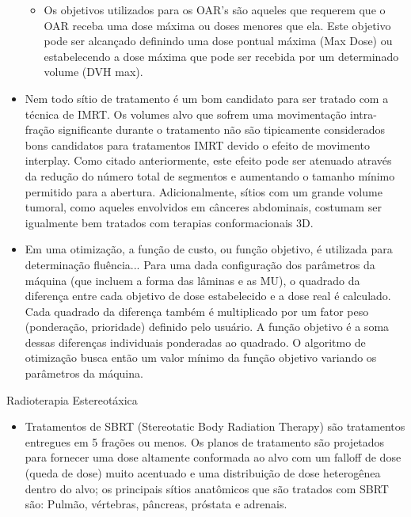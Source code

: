 \documentclass[11pt,a4paper]{article}
\newcounter{exemplo}
\begin{document}
\begin{exemplo}
\begin{itemize}
\begin{itemize}[label=\textcolor{CarnationPink}{\textopenbullet}]
                \item Os objetivos utilizados para os OAR's são aqueles que requerem que o OAR receba uma dose máxima ou doses menores que ela. Este objetivo pode ser alcançado definindo uma dose pontual máxima (Max Dose) ou estabelecendo a dose máxima que pode ser recebida por um determinado volume (DVH max).
            \end{itemize}

        \item Nem todo sítio de tratamento é um bom candidato para ser tratado com a técnica de IMRT. Os volumes alvo que sofrem uma movimentação intra-fração significante durante o tratamento não são tipicamente considerados bons candidatos para tratamentos IMRT devido o efeito de movimento interplay. Como citado anteriormente, este efeito pode ser atenuado através da redução do número total de segmentos e aumentando o tamanho mínimo permitido para a abertura. Adicionalmente, sítios com um grande volume tumoral, como aqueles envolvidos em cânceres abdominais, costumam ser igualmente bem tratados com terapias conformacionais 3D.
        
        \item Em uma otimização, a função de custo, ou função objetivo, é utilizada para determinação fluência... Para uma dada configuração dos parâmetros da máquina (que incluem a forma das lâminas e as MU), o quadrado da diferença entre cada objetivo de dose estabelecido e a dose real é calculado. Cada quadrado da diferença também é multiplicado por um fator peso (ponderação, prioridade) definido pelo usuário. A função objetivo é a soma dessas diferenças individuais ponderadas ao quadrado. O algoritmo de otimização busca então um valor mínimo da função objetivo variando os parâmetros da máquina. 

    \end{itemize}

    \textcolor{CarnationPink}{Radioterapia Estereotáxica}
    \begin{itemize}
        \item Tratamentos de SBRT (Stereotatic Body Radiation Therapy) são tratamentos entregues em 5 frações ou menos. Os planos de tratamento são projetados para fornecer uma dose altamente conformada ao alvo com um falloff de dose (queda de dose) muito acentuado e uma distribuição de dose heterogênea dentro do alvo; os principais sítios anatômicos que são tratados com SBRT são: Pulmão, vértebras, pâncreas, próstata e adrenais.
        

\end{itemize}
\end{exemplo}
\end{document}
